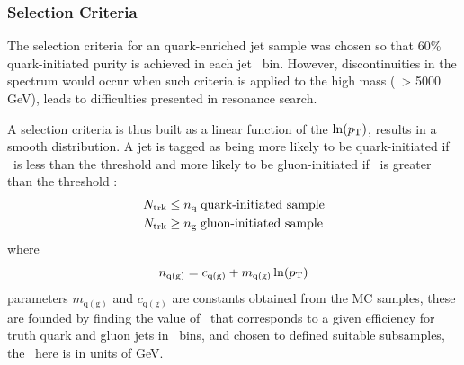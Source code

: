 %
%
%

\subsubsection{Selection Criteria}

The selection criteria for an quark-enriched jet sample was chosen so that 60\% quark-initiated purity is achieved in each jet \pt~bin. However, discontinuities in the \mjj spectrum would occur when such criteria is applied to the high mass (\pt~> 5000 GeV), leads to difficulties presented in resonance search. 


A selection criteria is thus built as a linear function of the $\ln(p_{\mathrm{T}}) $, results in a smooth \mjj distribution. A jet is tagged as being more likely to be quark-initiated if \ntrk~is less than
the threshold \nq and more likely to be gluon-initiated if \ntrk~is 
greater than the threshold \ngluon: 
\begin{align}
\ntrk & \le \nq \; \mbox{quark-initiated sample} %
\\
\ntrk	  & \ge \ngluon \; \mbox{gluon-initiated sample} \nonumber
\end{align}
where   
\begin{equation}
n_{\mathrm{q(g)}} = {c_{\mathrm{q(g)}} + m_{\mathrm{q(g)}} \ln(p_{\mathrm{T}})}  \label{eq:nqg2}
\end{equation}
parameters $m_{\mathrm{q(g)}}$ and $c_{\mathrm{q(g)}}$ are constants obtained from the MC samples, these are founded by  finding the value of \ntrk\ 
that corresponds to a given efficiency for truth quark and gluon jets in 
\pt~bins, and chosen to defined suitable subsamples, the \pt~here is in units of GeV.

